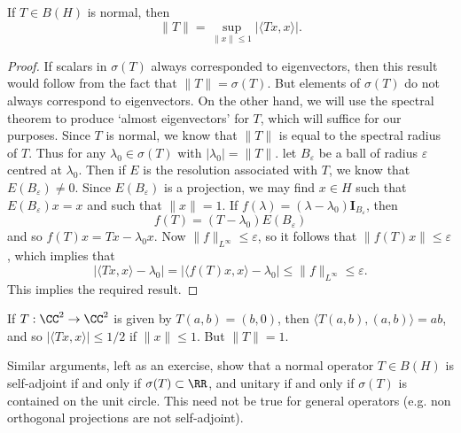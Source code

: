 \begin{theorem}
    If $T \in B(H)$ is normal, then
    \[ \| T \| = \sup_{\|x\| \leq 1} |\langle Tx, x \rangle|. \]
\end{theorem}
\begin{proof}
    If scalars in $\sigma(T)$ always corresponded to eigenvectors, then this result would follow from the fact that $\| T \| = \sigma(T)$. But elements of $\sigma(T)$ do not always correspond to eigenvectors. On the other hand, we will use the spectral theorem to produce `almost eigenvectors' for $T$, which will suffice for our purposes. Since $T$ is normal, we know that $\| T \|$ is equal to the spectral radius of $T$. Thus for any $\lambda_0 \in \sigma(T)$ with $|\lambda_0| = \| T \|$. let $B_\varepsilon$ be a ball of radius $\varepsilon$ centred at $\lambda_0$. Then if $E$ is the resolution associated with $T$, we know that $E(B_\varepsilon) \neq 0$. Since $E(B_\varepsilon)$ is a projection, we may find $x \in H$ such that $E(B_\varepsilon) x = x$ and such that $\| x \| = 1$. If $f(\lambda) = (\lambda - \lambda_0) \mathbf{I}_{B_\varepsilon}$, then
    \[ f(T) = (T - \lambda_0) E(B_\varepsilon) \]
    and so $f(T) x = Tx - \lambda_0 x$. Now $\| f \|_{L^\infty} \leq \varepsilon$, so it follows that $\| f(T) x \| \leq \varepsilon$, which implies that
    \[ |\langle Tx, x \rangle - \lambda_0| = |\langle f(T)x, x \rangle - \lambda_0| \leq \| f \|_{L^\infty} \leq \varepsilon. \]
    This implies the required result.
\end{proof}

\begin{remark}
    If $T: \CC^2 \to \CC^2$ is given by $T(a,b) = (b,0)$, then $\langle T(a,b), (a,b) \rangle = ab$, and so $|\langle Tx, x \rangle| \leq 1/2$ if $\| x \| \leq 1$. But $\| T \| = 1$.
\end{remark}

Similar arguments, left as an exercise, show that a normal operator $T \in B(H)$ is self-adjoint if and only if $\sigma(T) \subset \RR$, and unitary if and only if $\sigma(T)$ is contained on the unit circle. This need not be true for general operators (e.g. non orthogonal projections are not self-adjoint).

